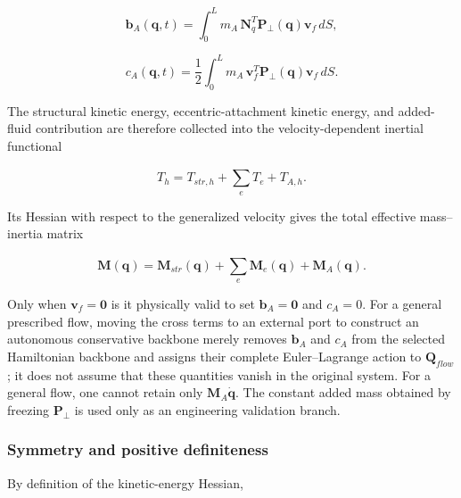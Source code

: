 \begin{equation}
\label{eq:galerkin-2-58}
\mathbf{b}_{A}\left( \mathbf{q},t \right) = \int_{0}^{L}m_{A}\,\mathbf{N}_{q}^{T}\mathbf{P}_{\bot}\left( \mathbf{q} \right)\mathbf{v}_{f}\, dS,
\end{equation}

\begin{equation}
\label{eq:galerkin-2-59}
c_{A}\left( \mathbf{q},t \right) = \frac{1}{2}\int_{0}^{L}m_{A}\,\mathbf{v}_{f}^{T}\mathbf{P}_{\bot}\left( \mathbf{q} \right)\mathbf{v}_{f}\, dS.
\end{equation}

The structural kinetic energy, eccentric-attachment kinetic energy, and added-fluid contribution are therefore collected into the velocity-dependent inertial functional

\begin{equation}
\label{eq:galerkin-2-60}
T_{h} = T_{str,h} + \sum_{e}^{}T_{e} + T_{A,h}.
\end{equation}

Its Hessian with respect to the generalized velocity gives the total effective mass--inertia matrix

\begin{equation}
\label{eq:galerkin-2-61}
\boxed{\mathbf{M}\left( \mathbf{q} \right) = \mathbf{M}_{str}\left( \mathbf{q} \right) + \sum_{e}^{}\mathbf{M}_{e}\left( \mathbf{q} \right) + \mathbf{M}_{A}\left( \mathbf{q} \right).}
\end{equation}

Only when \(\mathbf{v}_{f} = \mathbf{0}\) is it physically valid to set \(\mathbf{b}_{A} = \mathbf{0}\) and \(c_{A} = 0\). For a general prescribed flow, moving the cross terms to an external port to construct an autonomous conservative backbone merely removes \(\mathbf{b}_{A}\) and \(c_{A}\) from the selected Hamiltonian backbone and assigns their complete Euler--Lagrange action to \(\mathbf{Q}_{flow}\); it does not assume that these quantities vanish in the original system. For a general flow, one cannot retain only \(\mathbf{M}_{A}\dot{\mathbf{q}}\). The constant added mass obtained by freezing \(\mathbf{P}_{\bot}\) is used only as an engineering validation branch.

\subsubsection{Symmetry and positive definiteness}\label{sec:galerkin-2-4-7}

By definition of the kinetic-energy Hessian,

